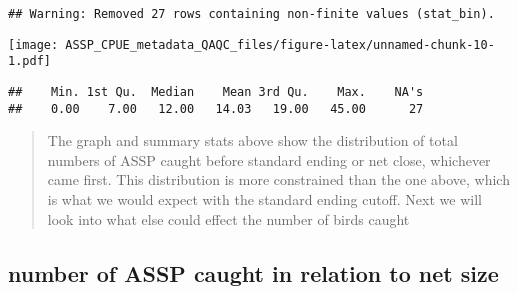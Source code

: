 \documentclass[
]{article}
\newenvironment{Shaded}{\begin{snugshade}}{\end{snugshade}}
\newcommand{\CommentTok}[1]{\textcolor[rgb]{0.56,0.35,0.01}{\textit{#1}}}
\newcommand{\DataTypeTok}[1]{\textcolor[rgb]{0.13,0.29,0.53}{#1}}
\newcommand{\DecValTok}[1]{\textcolor[rgb]{0.00,0.00,0.81}{#1}}
\newcommand{\KeywordTok}[1]{\textcolor[rgb]{0.13,0.29,0.53}{\textbf{#1}}}
\newcommand{\NormalTok}[1]{#1}
\newcommand{\OperatorTok}[1]{\textcolor[rgb]{0.81,0.36,0.00}{\textbf{#1}}}
\newcommand{\OtherTok}[1]{\textcolor[rgb]{0.56,0.35,0.01}{#1}}
\newcommand{\StringTok}[1]{\textcolor[rgb]{0.31,0.60,0.02}{#1}}
\begin{document}
\begin{verbatim}
## Warning: Removed 27 rows containing non-finite values (stat_bin).
\end{verbatim}

\texttt{[image: ASSP\_CPUE\_metadata\_QAQC\_files/figure-latex/unnamed-chunk-10-1.pdf]}

\begin{Shaded}
\end{Shaded}

\begin{verbatim}
##    Min. 1st Qu.  Median    Mean 3rd Qu.    Max.    NA's 
##    0.00    7.00   12.00   14.03   19.00   45.00      27
\end{verbatim}

\begin{quote}
The graph and summary stats above show the distribution of total numbers
of ASSP caught before standard ending or net close, whichever came
first. This distribution is more constrained than the one above, which
is what we would expect with the standard ending cutoff. Next we will
look into what else could effect the number of birds caught
\end{quote}

\hypertarget{number-of-assp-caught-in-relation-to-net-size}{%
\subsection{number of ASSP caught in relation to net
size}\label{number-of-assp-caught-in-relation-to-net-size}}

\begin{Shaded}
\end{Shaded}
\end{document}
